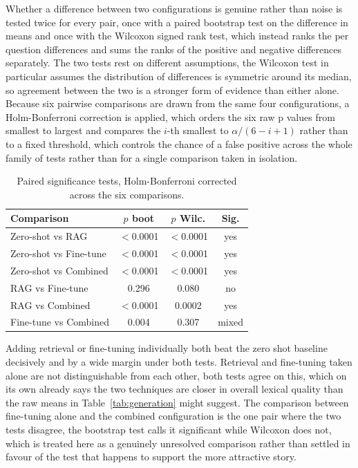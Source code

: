 \documentclass[11pt, a4paper]{article}
\begin{document}
Whether a difference between two configurations is genuine rather than noise is tested twice for every pair, once with a paired bootstrap test on the difference in means and once with the Wilcoxon signed rank test, which instead ranks the per question differences and sums the ranks of the positive and negative differences separately. The two tests rest on different assumptions, the Wilcoxon test in particular assumes the distribution of differences is symmetric around its median, so agreement between the two is a stronger form of evidence than either alone. Because six pairwise comparisons are drawn from the same four configurations, a Holm-Bonferroni correction is applied, which orders the six raw p values from smallest to largest and compares the $i$-th smallest to $\alpha / (6 - i + 1)$ rather than to a fixed threshold, which controls the chance of a false positive across the whole family of tests rather than for a single comparison taken in isolation.

\begin{table}[H]
\centering
\small
\begin{tabular}{lccc}
\toprule
\textbf{Comparison} & \textbf{$p$ boot} & \textbf{$p$ Wilc.} & \textbf{Sig.} \\
\midrule
Zero-shot vs RAG & $<$0.0001 & $<$0.0001 & yes \\
Zero-shot vs Fine-tune & $<$0.0001 & $<$0.0001 & yes \\
Zero-shot vs Combined & $<$0.0001 & $<$0.0001 & yes \\
RAG vs Fine-tune & 0.296 & 0.080 & no \\
RAG vs Combined & $<$0.0001 & 0.0002 & yes \\
Fine-tune vs Combined & 0.004 & 0.307 & mixed \\
\bottomrule
\end{tabular}
\caption{Paired significance tests, Holm-Bonferroni corrected across the six comparisons.}
\label{tab:sig}
\end{table}

Adding retrieval or fine-tuning individually both beat the zero shot baseline decisively and by a wide margin under both tests. Retrieval and fine-tuning taken alone are not distinguishable from each other, both tests agree on this, which on its own already says the two techniques are closer in overall lexical quality than the raw means in Table~\ref{tab:generation} might suggest. The comparison between fine-tuning alone and the combined configuration is the one pair where the two tests disagree, the bootstrap test calls it significant while Wilcoxon does not, which is treated here as a genuinely unresolved comparison rather than settled in favour of the test that happens to support the more attractive story.
\end{document}
